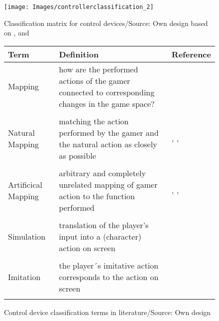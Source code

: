 \documentclass
[
    a4paper,
    11pt
]
{article}
\begin{document}
\begin{figure}[ht!]
\centering
    \texttt{[image: Images/controllerclassification\_2]}
    \caption{Classification matrix for control devices/Source: Own design based on \cite{Jenson2008}, \cite{Skalski2011} and \cite{McGloin2011}}
    \label{fig:controllerclassification}
\end{figure}

\begin{figure}[h]
    \centering
    \small
    \begin{tabular}{  l  p{5cm}  p{4cm}  }
      \hline
        Term        &   Definition  &   Reference   \\ \hline
        Mapping     &   how are the performed actions of the gamer connected to corresponding changes in the game space? &   \cite{Steuer1992}\\
                    &   &   \\
        Natural Mapping & matching the action performed by the gamer and the natural action as closely as possible & \cite{Skalski2011}, \cite{McGloin2011}, \cite{Steuer1992}\\
            &   &   \\
        Artificical Mapping &   arbitrary and completely unrelated mapping of gamer action to the function performed & \cite{Skalski2011}, \cite{McGloin2011}, \cite{Steuer1992}\\
            &   &   \\
        Simulation  &   translation of  the player's input into a (character) action on screen& \cite{Jenson2008}\\
            &   &   \\
        Imitation   &   the player´s imitative action corresponds to the action on screen& \cite{Jenson2008}\\
            &   &   \\ \hline
    \end{tabular}
    \caption{Control device classification terms in literature/Source: Own design}
    \label{tab:controllerclassificationterms}
\end{figure}
\end{document}
